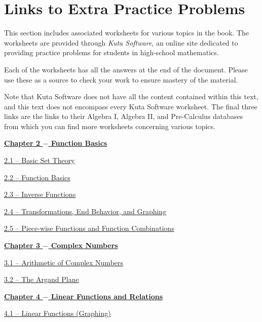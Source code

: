 \documentclass[../book.tex]{subfiles}
\begin{document}
\chapter{Links to Extra Practice Problems}
\noindent This section includes associated worksheets for various topics in the book.  The worksheets are provided through \textit{Kuta Software}, an online site dedicated to providing practice problems for students in high-school mathematics.

Each of the worksheets has all the answers at the end of the document.  Please use these as a source to check your work to ensure mastery of the material.

Note that Kuta Software does not have all the content contained within this text, and this text does not encompass every Kuta Software worksheet.  The final three links are the links to their Algebra I, Algebra II, and Pre-Calculus databases from which you can find more worksheets concerning various topics.

\noindent \underline{\textbf{Chapter 2 $-$ Function Basics}}

\href{https://cdn.kutasoftware.com/Worksheets/Alg1/Number%20Sets.pdf}{2.1 – Basic Set Theory}

\href{https://www.leonschools.net/cms/lib7/FL01903265/Centricity/Domain/4838/Ch%202.1%20%20Functions%20Domain%20and%20Range%20Review%20WKSH%20PDF.pdf}{2.2 – Function Basics}

\href{https://cdn.kutasoftware.com/Worksheets/Precalc/01%20-%20Function%20Inverses.pdf}{2.3 – Inverse Functions}

\href{https://cdn.kutasoftware.com/Worksheets/Precalc/01%20-%20Transformations%20of%20Graphs.pdf}{2.4 – Transformations, End Behavior, and Graphing}

\href{https://cdn.kutasoftware.com/Worksheets/Precalc/01%20-%20Function%20Operations.pdf}{2.5 – Piece-wise Functions and Function Combinations}

\noindent \underline{\textbf{Chapter 3 $-$ Complex Numbers}}

\href{https://cdn.kutasoftware.com/Worksheets/Alg2/Operations%20with%20Complex%20Numbers.pdf}{3.1 – Arithmetic of Complex Numbers}

\href{https://cdn.kutasoftware.com/Worksheets/Alg2/Properties%20of%20Complex%20Numbers.pdf}{3.2 – The Argand Plane}

\noindent \underline{\textbf{Chapter 4 $-$ Linear Functions and Relations}}

\href{https://cdn.kutasoftware.com/Worksheets/Alg1/Graphing%20Lines%20SF.pdf}{4.1 – Linear Functions (Graphing)}
\end{document}
